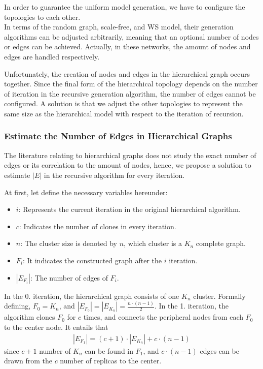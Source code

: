 In order to guarantee the uniform model generation, we have to configure the topologies to each other.\\
In terms of the random graph, scale-free, and WS model, their generation algorithms can be adjusted arbitrarily, meaning that an optional number of nodes or edges can be achieved. Actually, in these networks, the amount of nodes and edges are handled respectively.

Unfortunately, the creation of nodes and edges in the hierarchical graph occurs together. Since the final form of the hierarchical topology depends on the number of iteration in the recursive generation algorithm, the number of edges cannot be configured. A solution is that we adjust the other topologies to represent the same size as the hierarchical model with respect to the iteration of recursion. %

\subsubsection{Estimate the Number of Edges in Hierarchical Graphs}

The literature relating to hierarchical graphs does not study the exact number of edges or its correlation to the amount of nodes, hence, we propose a solution to estimate $|E|$ in the recursive algorithm for every iteration.

At first, let define the necessary variables hereunder:
\begin{itemize}
	\item{$i$}: Represents the current iteration in the original hierarchical algorithm.
	\item{$c$}: Indicates the number of clones in every iteration.
	\item{$n$}: The cluster size is denoted by $n$, which cluster is a $K_n$ complete graph. %
	\item{$F_i$}: It indicates the constructed graph after the $i$ iteration. %
	\item{$|E_{F_i}|$}: The number of edges of $F_i$.
\end{itemize}

In the 0. iteration, the hierarchical graph consists of one $K_n$ cluster. Formally defining, $F_0 = K_n$, and $|E_{F_0}| = |E_{K_n}| = \frac{n \cdot (n-1)}{2}$. In the 1. iteration, the algorithm clones $F_0$ for $c$ times, and connects the peripheral nodes from each $F_0$ to the center node. It entails that 
\begin{align}\label{eq:f1_version1}
	|E_{F_1}| = (c+1) \cdot |E_{K_n}| + c \cdot (n - 1)	
\end{align}
since $c+1$ number of $K_n$ can be found in $F_1$, and $c \cdot (n - 1)$ edges can be drawn from the $c$ number of replicas to the center.

